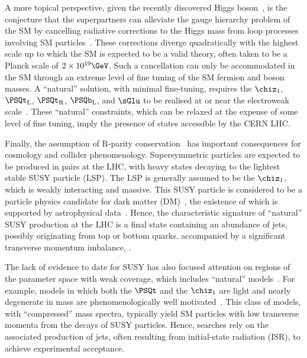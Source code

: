 A more topical perspective, given the recently discovered Higgs
boson~\cite{ref:atlashiggsdiscovery, ref:cmshiggsdiscovery,
  ref:cmshiggsdiscoverylong}, is the conjecture that the superpartners
can alleviate the gauge hierarchy problem of the SM 
by cancelling radiative corrections to the Higgs mass from loop
processes involving SM particles~\cite{ref:hierarchy1,
  ref:hierarchy2}. These corrections diverge quadratically with the
highest scale up to which the SM is expected to be a valid theory,
often taken to be a Planck scale of $2\times10^{19}\GeV$. Such a
cancellation can only be accommodated in the SM through an extreme
level of fine tuning of the SM fermion and boson masses. A ``natural''
solution, with minimal fine-tuning, requires the $\chiz_1$,
$\PSQt_\text{L}$, $\PSQt_\text{R}$, $\PSQb_\text{L}$, and $\sGlu$ to
be realised at or near the electroweak scale~\cite{ref:barbierinsusy}.
These ``natural'' constraints, which can be relaxed at the expense of
some level of fine tuning, imply the presence of states accessible by
the CERN LHC.

Finally, the assumption of R-parity conservation~\cite{Farrar:1978xj}
has important consequences for cosmology and collider
phenomenology. Supersymmetric particles are expected to be produced in
pairs at the LHC, with heavy states decaying to the lightest stable
SUSY particle (LSP). The LSP is generally assumed to be the
$\chiz_1$, which is weakly interacting and massive. This SUSY particle
is considered to be a particle physics candidate for dark matter
(DM)~\cite{Jungman:1995df}, the existence of which is supported by
astrophysical data~\cite{1674-1137-38-9-090001}.  Hence, the
characteristic signature of ``natural'' SUSY production at the LHC is
a final state containing an abundance of jets, possibly originating
from top or bottom quarks, accompanied by a significant transverse
momentum imbalance, \ptvecmiss.

The lack of evidence to date for SUSY has also focused attention on
regions of the parameter space with weak coverage, which includes
``natural'' models~\cite{Delgado:2012eu, Boehm:1999tr, Carena:2008mj,
  Grober:2014aha, Grober:2015fia}. For example, models in which both
the $\PSQt$ and the $\chiz_1$ are light and nearly degenerate in mass
are phenomenologically well motivated~\cite{Boehm:1999bj,
  Balazs:2004bu, Martin:2007gf, Martin:2007hn}. This class of models,
with ``compressed'' mass spectra, typically yield SM particles with
low transverse momenta from the decays of SUSY particles. Hence,
searches rely on the associated production of jets, often resulting
from initial-state radiation (ISR), to achieve experimental
acceptance.

